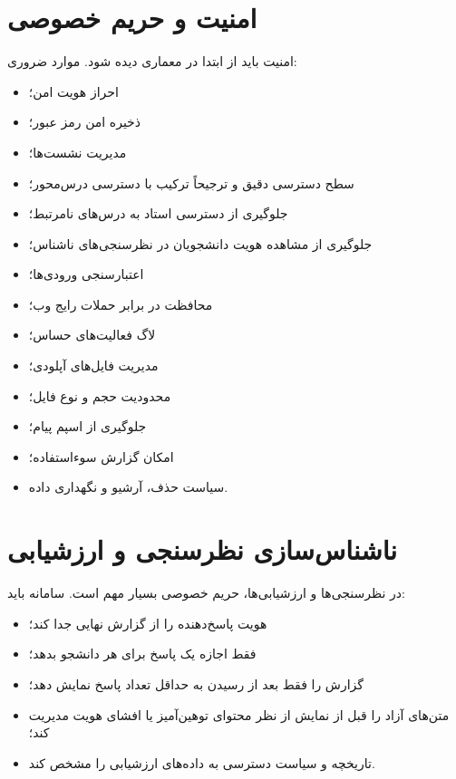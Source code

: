 \documentclass[12pt,a4paper]{article}
\begin{document}
\section{امنیت و حریم خصوصی}
امنیت باید از ابتدا در معماری دیده شود. موارد ضروری:
\begin{itemize}
\item احراز هویت امن؛
\item ذخیره امن رمز عبور؛
\item مدیریت نشست‌ها؛
\item سطح دسترسی دقیق  و ترجیحاً ترکیب با دسترسی درس‌محور؛
\item جلوگیری از دسترسی استاد به درس‌های نامرتبط؛
\item جلوگیری از مشاهده هویت دانشجویان در نظرسنجی‌های ناشناس؛
\item اعتبارسنجی ورودی‌ها؛
\item محافظت در برابر حملات رایج وب؛
\item لاگ فعالیت‌های حساس؛
\item مدیریت فایل‌های آپلودی؛
\item محدودیت حجم و نوع فایل؛
\item جلوگیری از اسپم پیام؛
\item امکان گزارش سوءاستفاده؛
\item سیاست حذف، آرشیو و نگهداری داده.
\end{itemize}

\section{ناشناس‌سازی نظرسنجی و ارزشیابی}
در نظرسنجی‌ها و ارزشیابی‌ها، حریم خصوصی بسیار مهم است. سامانه باید:
\begin{itemize}
\item هویت پاسخ‌دهنده را از گزارش نهایی جدا کند؛
\item فقط اجازه یک پاسخ برای هر دانشجو بدهد؛
\item گزارش را فقط بعد از رسیدن به حداقل تعداد پاسخ نمایش دهد؛
\item متن‌های آزاد را قبل از نمایش از نظر محتوای توهین‌آمیز یا افشای هویت مدیریت کند؛
\item تاریخچه و سیاست دسترسی به داده‌های ارزشیابی را مشخص کند.
\end{itemize}
\end{document}
